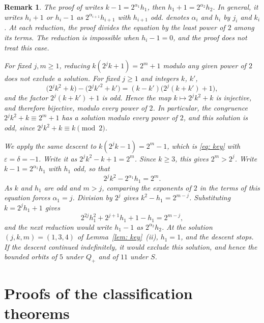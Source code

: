 \documentclass{article}
\newtheorem{remark}{Remark}
\newcommand{\Ge}{\geqslant}
\begin{document}
\begin{remark}
\label{rem: descent}
    The proof of \citep[Lemma~2]{sedaghat2020dual} writes $k - 1 = 2^{\alpha_1} h_1$, then $h_1 + 1 = 2^{\alpha_2} h_2$. In general, it writes $h_i + 1$ or $h_i - 1$ as $2^{\alpha_{i+1}} h_{i+1}$ with $h_{i+1}$ odd. \citet{sedaghat2020dual} denotes $\alpha_i$ and $h_i$ by $j_i$ and $k_i$. At each reduction, the proof divides the equation by the least power of $2$ among its terms. The reduction is impossible when $h_i - 1 = 0$, and the proof does not treat this case.

    For fixed $j, m \Ge 1$, reducing $k (2^j k + 1) = 2^m + 1$ modulo any given power of $2$ does not exclude a solution. For fixed $j \Ge 1$ and integers $k$, $k'$,
    \begin{equation*}
        \bigl( 2^j k^2 + k \bigr) - \bigl( 2^j k'^2 + k' \bigr) = (k - k') \bigl( 2^j (k + k') + 1 \bigr) ,
    \end{equation*}
    and the factor $2^j (k + k') + 1$ is odd. Hence the map $k \mapsto 2^j k^2 + k$ is injective, and therefore bijective, modulo every power of $2$. In particular, the congruence $2^j k^2 + k \equiv 2^m + 1$ has a solution modulo every power of $2$, and this solution is odd, since $2^j k^2 + k \equiv k \pmod 2$.

    We apply the same descent to $k (2^j k - 1) = 2^m - 1$, which is \eqref{eq: key} with $\varepsilon = \delta = -1$. Write it as $2^j k^2 - k + 1 = 2^m$. Since $k \Ge 3$, this gives $2^m > 2^j$. Write $k - 1 = 2^{\alpha_1} h_1$ with $h_1$ odd, so that
    \begin{equation*}
        2^j k^2 - 2^{\alpha_1} h_1 = 2^m .
    \end{equation*}
    As $k$ and $h_1$ are odd and $m > j$, comparing the exponents of $2$ in the terms of this equation forces $\alpha_1 = j$. Division by $2^j$ gives $k^2 - h_1 = 2^{m-j}$. Substituting $k = 2^j h_1 + 1$ gives
    \begin{equation*}
        2^{2j} h_1^2 + 2^{j+1} h_1 + 1 - h_1 = 2^{m-j} ,
    \end{equation*}
    and the next reduction would write $h_1 - 1$ as $2^{\alpha_2} h_2$. At the solution $(j, k, m) = (1, 3, 4)$ of Lemma~\ref{lem: key}~(ii), $h_1 = 1$, and the descent stops. If the descent continued indefinitely, it would exclude this solution, and hence the bounded orbits of $5$ under $Q_+$ and of $11$ under $S$.
\end{remark}

\section{Proofs of the classification theorems}
\label{sec: proofs}
\end{document}
